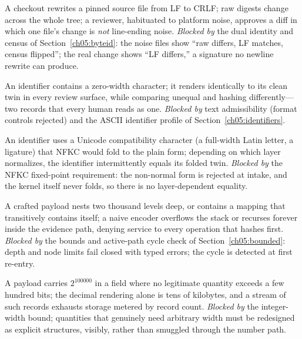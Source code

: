 \begin{example}\label{ch05:ex:autocrlf}
A checkout rewrites a pinned source file from LF to CRLF; raw digests
change across the whole tree; a reviewer, habituated to platform noise,
approves a diff in which one file's change is \emph{not} line-ending
noise. \emph{Blocked by} the dual identity and census of
Section~\ref{ch05:byteid}: the noise files show ``raw differs, LF
matches, census flipped''; the real change shows ``LF differs,'' a
signature no newline rewrite can produce.
\end{example}

\begin{example}\label{ch05:ex:invisible}
An identifier contains a zero-width character; it renders identically to
its clean twin in every review surface, while comparing unequal and
hashing differently---two records that every human reads as one.
\emph{Blocked by} text admissibility (format controls rejected) and the
ASCII identifier profile of Section~\ref{ch05:identifiers}.
\end{example}

\begin{example}\label{ch05:ex:confusable}
An identifier uses a Unicode compatibility character (a full-width Latin
letter, a ligature) that NFKC would fold to the plain form; depending on
which layer normalizes, the identifier intermittently equals its folded
twin. \emph{Blocked by} the NFKC fixed-point requirement: the non-normal
form is rejected at intake, and the kernel itself never folds, so there
is no layer-dependent equality.
\end{example}

\begin{example}\label{ch05:ex:bomb}
A crafted payload nests two thousand levels deep, or contains a mapping
that transitively contains itself; a naive encoder overflows the stack or
recurses forever inside the evidence path, denying service to every
operation that hashes first. \emph{Blocked by} the bounds and active-path
cycle check of Section~\ref{ch05:bounded}: depth and node limits fail
closed with typed errors; the cycle is detected at first re-entry.
\end{example}

\begin{example}\label{ch05:ex:bigint}
A payload carries $2^{100000}$ in a field where no legitimate quantity
exceeds a few hundred bits; the decimal rendering alone is tens of
kilobytes, and a stream of such records exhausts storage metered by
record count. \emph{Blocked by} the integer-width bound; quantities that
genuinely need arbitrary width must be redesigned as explicit structures,
visibly, rather than smuggled through the number path.
\end{example}

